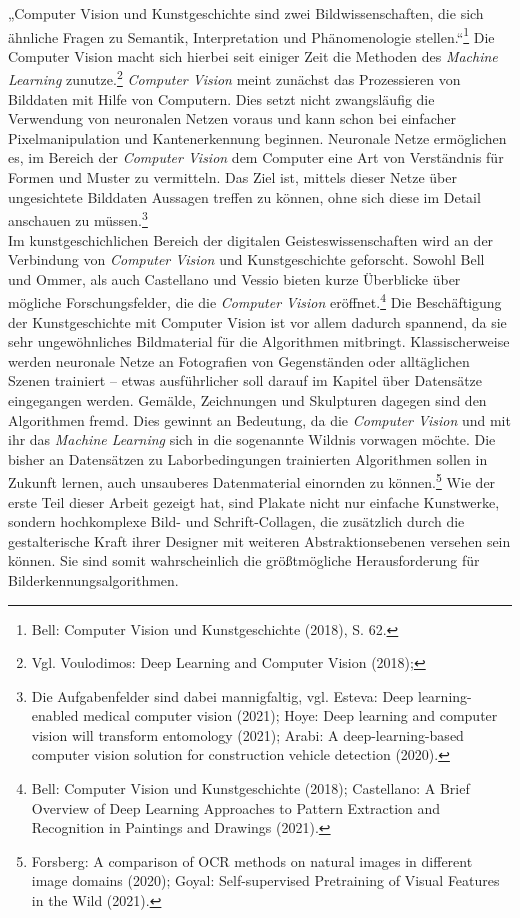 \documentclass[a4paper,12pt,ngerman]{article}
\begin{document}
„Computer Vision und Kunstgeschichte sind zwei Bildwissenschaften, die sich ähnliche Fragen zu Semantik, Interpretation und Phänomenologie stellen.“\footnote{Bell: Computer Vision und Kunstgeschichte (2018), S. 62.} Die Computer Vision macht sich hierbei seit einiger Zeit die Methoden des \textit{Machine Learning} zunutze.\footnote{Vgl. Voulodimos: Deep Learning and Computer Vision (2018); } \textit{Computer Vision} meint zunächst das Prozessieren von Bilddaten mit Hilfe von Computern. Dies setzt nicht zwangsläufig die Verwendung von neuronalen Netzen voraus und kann schon bei einfacher Pixelmanipulation und Kantenerkennung beginnen. Neuronale Netze ermöglichen es, im Bereich der \textit{Computer Vision} dem Computer eine Art von Verständnis für Formen und Muster zu vermitteln. Das Ziel ist, mittels dieser Netze über ungesichtete Bilddaten Aussagen treffen zu können, ohne sich diese im Detail anschauen zu müssen.\footnote{Die Aufgabenfelder sind dabei mannigfaltig, vgl. Esteva: Deep learning-enabled medical computer vision (2021); Hoye: Deep learning and computer vision will transform entomology (2021); Arabi: A deep-learning-based computer vision solution for construction vehicle detection (2020).} \\
Im kunstgeschichlichen Bereich der digitalen Geisteswissenschaften wird an der Verbindung von \textit{Computer Vision} und Kunstgeschichte geforscht. Sowohl Bell und Ommer, als auch Castellano und Vessio bieten kurze Überblicke über mögliche Forschungsfelder, die die \textit{Computer Vision} eröffnet.\footnote{Bell: Computer Vision und Kunstgeschichte (2018); Castellano: A Brief Overview of Deep Learning Approaches to Pattern Extraction and Recognition in Paintings and Drawings (2021).} Die Beschäftigung der Kunstgeschichte mit Computer Vision ist vor allem dadurch spannend, da sie sehr ungewöhnliches Bildmaterial für die Algorithmen mitbringt. Klassischerweise werden neuronale Netze an Fotografien von Gegenständen oder alltäglichen Szenen trainiert -- etwas ausführlicher soll darauf im Kapitel über Datensätze eingegangen werden. Gemälde, Zeichnungen und Skulpturen dagegen sind den Algorithmen fremd. Dies gewinnt an Bedeutung, da die \textit{Computer Vision} und mit ihr das \textit{Machine Learning} sich in die sogenannte Wildnis vorwagen möchte. Die bisher an Datensätzen zu Laborbedingungen trainierten Algorithmen sollen in Zukunft lernen, auch unsauberes Datenmaterial einornden zu können.\footnote{Forsberg: A comparison of OCR methods on natural images in different image domains (2020); Goyal: Self-supervised Pretraining of Visual Features in the Wild (2021).} Wie der erste Teil dieser Arbeit gezeigt hat, sind Plakate nicht nur einfache Kunstwerke, sondern hochkomplexe Bild- und Schrift-Collagen, die zusätzlich durch die gestalterische Kraft ihrer Designer mit weiteren Abstraktionsebenen versehen sein können. Sie sind somit wahrscheinlich die größtmögliche Herausforderung für Bilderkennungsalgorithmen. \\
\end{document}
